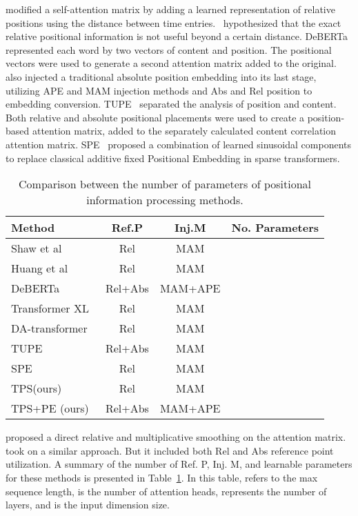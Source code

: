\documentclass[journal]{IEEEtran}
\begin{document}
\cite{shaw_self-attention_2018} modified a self-attention matrix by adding a learned representation of relative positions using the distance between time entries.~\cite{shaw_self-attention_2018} hypothesized that the exact relative positional information is not useful beyond a certain distance.
DeBERTa~\cite{he2021deberta} represented each word by two vectors of content and position. The positional vectors were used to generate a second attention matrix added to the original.~\cite{he2021deberta} also injected a traditional absolute position embedding into its last stage, utilizing APE and MAM injection methods and Abs and Rel position to embedding conversion. TUPE~\cite{ke_rethinking_2021} separated the analysis of position and content. Both relative and absolute positional placements were used to create a position-based attention matrix, added to the separately calculated content correlation attention matrix. SPE~\cite{pmlr-v139-liutkus21a} proposed a combination of  learned sinusoidal components to replace classical additive fixed Positional Embedding in sparse transformers.
\begin{table}[!t]
\setlength{\tabcolsep}{4pt}
\centering
  \caption{Comparison between the number of parameters of positional information processing methods.}
\begin{tabular}{l|ccc}
\toprule
Method & Ref.P & Inj.M & No. Parameters \\
\midrule
Shaw et al~\cite{shaw_self-attention_2018} & Rel & MAM &   \\
Huang et al~\cite{huang-etal-2020-improve} & Rel & MAM &   \\
DeBERTa~\cite{he2021deberta} & Rel+Abs & MAM+APE &   \\
Transformer XL~\cite{dai-etal-2019-transformer} & Rel & MAM &   \\
DA-transformer~\cite{wu_da-transformer_2021} & Rel & MAM &   \\
TUPE~\cite{ke_rethinking_2021} & Rel+Abs & MAM &   \\
SPE~\cite{pmlr-v139-liutkus21a} & Rel & MAM &   \\
TPS(ours) & Rel & MAM &   \\
TPS+PE (ours) & Rel+Abs & MAM+APE &   \\
\bottomrule
\end{tabular}


  \label{tb:nop}
 \end{table}
 
\cite{wu_da-transformer_2021} proposed a direct relative and multiplicative smoothing on the attention matrix.~\cite{huang-etal-2020-improve} took on a similar approach. But it included both Rel and Abs reference point utilization. A summary of the number of Ref. P, Inj. M, and learnable parameters for these methods is presented in Table~\ref{tb:nop}. In this table,  refers to the max sequence length,  is the number of attention heads,  represents the number of layers, and  is the input dimension size. 
\end{document}
